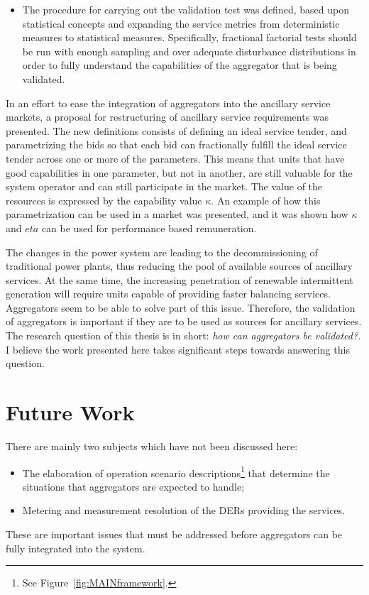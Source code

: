 \begin{description}
\begin{itemize}
			\item The procedure for carrying out the validation test was defined, based upon statistical concepts and expanding the service metrics from deterministic measures to statistical measures. Specifically, fractional factorial tests should be run with enough sampling and over adequate disturbance distributions in order to fully understand the capabilities of the aggregator that is being validated.
		\end{itemize}
\end{description}

In an effort to ease the integration of aggregators into the ancillary service markets, a proposal for restructuring of ancillary service requirements was presented. The new definitions consists of defining an ideal service tender, and parametrizing the bids so that each bid can fractionally fulfill the ideal service tender across one or more of the parameters. This means that units that have good capabilities in one parameter, but not in another, are still valuable for the system operator and can still participate in the market. The value of the resources is expressed by the capability value $\kappa$. An example of how this parametrization can be used in a market was presented, and it was shown how $\kappa$ and $eta$ can be used for performance based remuneration.

The changes in the power system are leading to the decommissioning of traditional power plants, thus reducing the pool of available sources of ancillary services. At the same time, the increasing penetration of renewable intermittent generation will require units capable of providing faster balancing services. Aggregators seem to be able to solve part of this issue. Therefore, the validation of aggregators is important if they are to be used as sources for ancillary services. The research question of this thesis is in short: \emph{how can aggregators be validated?}. I believe the work presented here takes significant steps towards answering this question.



\section{Future Work} %
\label{sec:FutureWork}
There are mainly two subjects which have not been discussed here:
\begin{itemize}
	\item The elaboration of operation scenario descriptions\footnote{See Figure~\ref{fig:MAINframework}.} that determine the situations that aggregators are expected to handle;
	\item Metering and measurement resolution of the DERs providing the services. 
\end{itemize}
These are important issues that must be addressed before aggregators can be fully integrated into the system. 

